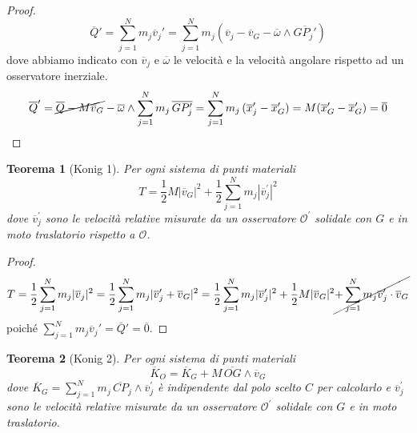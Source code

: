 \documentclass{book}
\theoremstyle{plain}
\newtheorem{teo}{Teorema}[chapter]
\theoremstyle{plain}
\theoremstyle{plain}
\theoremstyle{plain}
\theoremstyle{plain}
\theoremstyle{definition}
\theoremstyle{remark}
\theoremstyle{definition}
\begin{document}
\begin{proof}
    \begin{displaymath}
        \overline{Q}'=\sum_{j=1}^Nm_j\overline{v}_j'=\sum_{j=1}^Nm_j\left(\overline{v}_j-\overline{v}_G-\overline{\omega}\wedge\overline{GP_j'}\right)
    \end{displaymath}
    dove abbiamo indicato con $\overline{v}_j$ e $\overline{\omega}$ le velocità e la velocità angolare rispetto ad un osservatore inerziale.
    \begin{displaymath}
        \overline{Q}'=\cancel{\overline{Q}-M\overline{v}_G}-\overline{\omega}\wedge\sum_{j=1}^Nm_j\,\overline{GP_j'}=\sum_{j=1}^Nm_j\,(\overline{x}_j'-\overline{x}_G')=M(\overline{x}_G'-\overline{x}_G')=\overline{0}
    \end{displaymath}
\end{proof}

\begin{teo}[Konig 1]
    Per ogni sistema di punti materiali
    \begin{displaymath}
    \boxed{
        T=\frac{1}{2} M |\overline{v}_G|^2 + \frac{1}{2} \sum_{j=1}^N m_j |\overline{v}_j^{\prime}|^2
        }
    \end{displaymath}
    dove $\overline{v}_j^{\prime}$ sono le velocità relative misurate da un osservatore $\mathcal{O}^{\prime}$ solidale con $G$ e in moto traslatorio rispetto a $\mathcal{O}$.
\end{teo}

\begin{proof}
    \begin{displaymath}
        T=\frac{1}{2}\sum_{j=1}^Nm_j|\overline{v}_j|^2=\frac{1}{2}\sum_{j=1}^Nm_j|\overline{v}_j'+\overline{v}_G|^2=\frac{1}{2}\sum_{j=1}^Nm_j|\overline{v}_j'|^2+\frac{1}{2}M|\overline{v}_G|^2\cancel{+\sum_{j=1}^Nm_j\overline{v}_j'\cdot\overline{v}_G}
    \end{displaymath}
    poiché $\sum_{j=1}^Nm_j\overline{v}_j'=\overline{Q}'=\overline{0}$.
\end{proof}

\begin{teo}[Konig 2]
    Per ogni sistema di punti materiali
    \begin{displaymath}
    \boxed{
        \overline{K}_O =\overline{K}_G + M \, \overline{OG} \wedge \overline{v}_G
        }
    \end{displaymath}
    dove $\overline{K}_G = \sum_{j=1}^N m_j \,\overline{CP}_j \wedge \overline{v}_j^{\prime}$ è indipendente dal polo scelto $C$ per calcolarlo e $\overline{v}_j^{\prime}$ sono le velocità relative misurate da un osservatore $\mathcal{O}^{\prime}$ solidale con $G$ e in moto traslatorio.
\end{teo}
\end{document}
